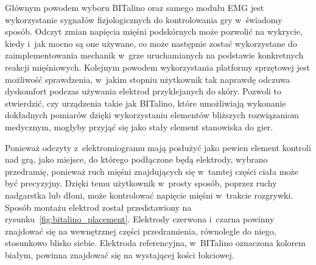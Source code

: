 Głównym powodem wyboru BITalino oraz samego modułu EMG jest wykorzystanie sygnałów fizjologicznych do kontrolowania gry w~świadomy sposób. Odczyt zmian napięcia mięśni podskórnych może pozwolić na wykrycie, kiedy i~jak mocno są one używane, co może następnie zostać wykorzystane do zaimplementowania mechanik w~grze uruchamianych na podstawie konkretnych reakcji mięśniowych. Kolejnym powodem wykorzystania platformy sprzętowej jest możliwość sprawdzenia, w~jakim stopniu użytkownik tak naprawdę odczuwa dyskomfort podczas używania elektrod przyklejanych do skóry. Pozwoli to stwierdzić, czy urządzenia takie jak BITalino, które umożliwiają wykonanie dokładnych pomiarów dzięki wykorzystaniu elementów bliższych rozwiązaniom medycznym, mogłyby przyjąć się jako stały element stanowiska do gier.

Ponieważ odczyty z~elektromiogramu mają posłużyć jako pewien element kontroli nad grą, jako miejsce, do którego podłączone będą elektrody, wybrano przedramię, ponieważ ruch mięśni znajdujących się w~tamtej części ciała może być precyzyjny. Dzięki temu użytkownik w~prosty sposób, poprzez ruchy nadgarstka lub dłoni, może kontrolować napięcie mięśni w~trakcie rozgrywki. Sposób montażu elektrod został przedstawiony na rysunku~\ref{fig:bitalino_placement}. Elektrody czerwona i~czarna powinny znajdować się na wewnętrznej części przedramienia, równolegle do niego, stosunkowo blisko siebie. Elektroda referencyjna, w~BITalino oznaczona kolorem białym, powinna znajdować się na wystającej kości łokciowej.
